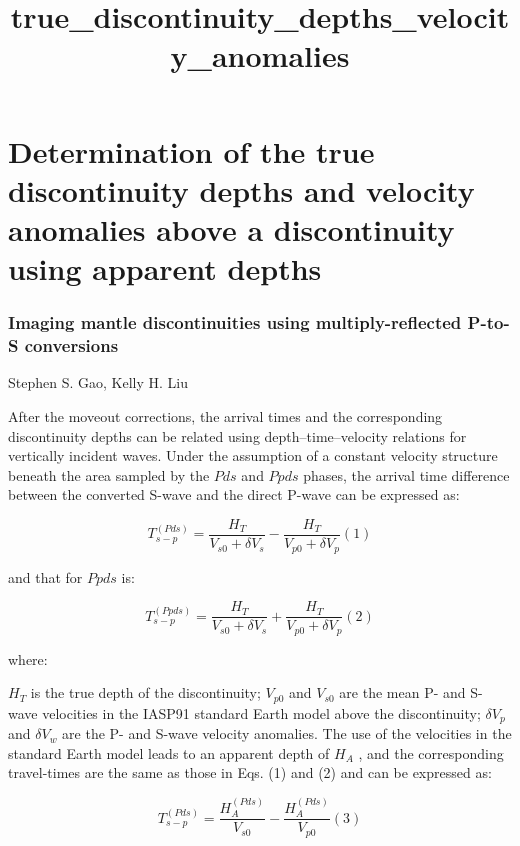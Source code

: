 \documentclass[11pt]{article}
\title{true\_discontinuity\_depths\_velocity\_anomalies}
\begin{document}
    
    
    \maketitle
    
    

    
    \section{Determination of the true discontinuity depths and velocity
anomalies above a discontinuity using apparent
depths}\label{determination-of-the-true-discontinuity-depths-and-velocity-anomalies-above-a-discontinuity-using-apparent-depths}

    \subsubsection{Imaging mantle discontinuities using multiply-reflected
P-to-S
conversions}\label{imaging-mantle-discontinuities-using-multiply-reflected-p-to-s-conversions}

Stephen S. Gao, Kelly H. Liu

    After the moveout corrections, the arrival times and the corresponding
discontinuity depths can be related using depth--time--velocity
relations for vertically incident waves. Under the assumption of a
constant velocity structure beneath the area sampled by the \(Pds\) and
\(Ppds\) phases, the arrival time difference between the converted
S-wave and the direct P-wave can be expressed as:

    \[
T_{s - p}^{(Pds)} = \frac{H_{T}}{V_{s0} + \delta V_{s}} - \frac{H_{T}}{V_{p0} + \delta V_{p}}(1)
\]

    and that for \(Ppds\) is:

    \[
T_{s - p}^{(Ppds)} = \frac{H_{T}}{V_{s0} + \delta V_{s}} + \frac{H_{T}}{V_{p0} + \delta V_{p}} (2)
\]

    where:

\(H_{T}\) is the true depth of the discontinuity; \(V_{p0}\) and
\(V_{s0}\) are the mean P- and S-wave velocities in the IASP91 standard
Earth model above the discontinuity; \(\delta V_{p}\) and
\(\delta V_{w}\) are the P- and S-wave velocity anomalies. The use of
the velocities in the standard Earth model leads to an apparent depth of
\(H_{A}\) , and the corresponding travel-times are the same as those in
Eqs. (1) and (2) and can be expressed as:

    \[
T_{s - p}^{(Pds)} = \frac{H_{A}^{(Pds)}}{V_{s0}}  -  \frac{H_{A}^{(Pds)}}{V_{p0}} (3)
\]
\end{document}
